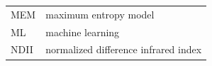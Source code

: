 \documentclass[remotesensing,article,accept,moreauthors,pdftex]{Definitions/mdpi}
\begin{document}
\begin{paracol}{2}
{\begin{tabular}{@{}ll}
		MEM     & maximum entropy model                                   \\
		ML      & machine learning                                        \\
		NDII    & normalized difference infrared index                    \\
	\end{tabular}

}
\end{paracol}
\end{document}
